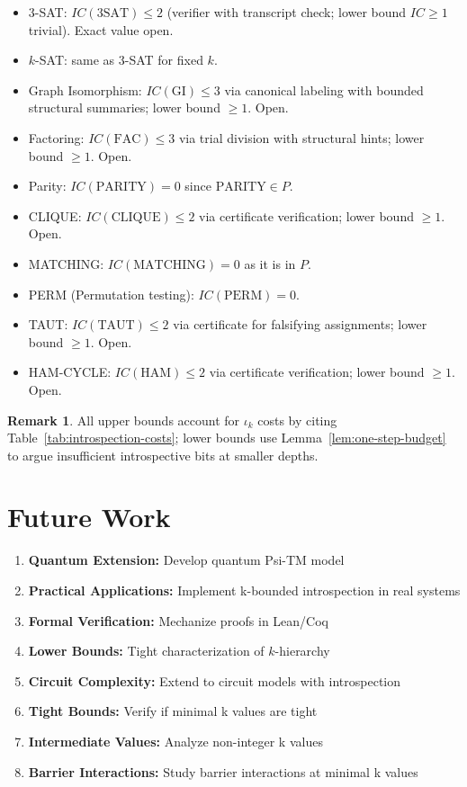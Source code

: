 \documentclass[11pt]{article}
\theoremstyle{definition}
\newtheorem{remark}[theorem]{Remark}
\begin{document}
\begin{itemize}
  \item 3-SAT: $IC(\mathrm{3SAT})\le 2$ (verifier with transcript check; lower bound $IC\ge1$ trivial). Exact value open.
  \item $k$-SAT: same as 3-SAT for fixed $k$.
  \item Graph Isomorphism: $IC(\mathrm{GI})\le 3$ via canonical labeling with bounded structural summaries; lower bound $\ge1$. Open.
  \item Factoring: $IC(\mathrm{FAC})\le 3$ via trial division with structural hints; lower bound $\ge1$. Open.
  \item Parity: $IC(\mathrm{PARITY})=0$ since $\mathrm{PARITY}\in P$.
  \item CLIQUE: $IC(\mathrm{CLIQUE})\le 2$ via certificate verification; lower bound $\ge1$. Open.
  \item MATCHING: $IC(\mathrm{MATCHING})=0$ as it is in $P$.
  \item PERM (Permutation testing): $IC(\mathrm{PERM})=0$.
  \item TAUT: $IC(\mathrm{TAUT})\le 2$ via certificate for falsifying assignments; lower bound $\ge1$. Open.
  \item HAM-CYCLE: $IC(\mathrm{HAM})\le 2$ via certificate verification; lower bound $\ge1$. Open.
\end{itemize}

\begin{remark}
All upper bounds account for $\iota_k$ costs by citing Table~\ref{tab:introspection-costs}; lower bounds use Lemma~\ref{lem:one-step-budget} to argue insufficient introspective bits at smaller depths.
\end{remark}

\section{Future Work}

\begin{enumerate}
\item \textbf{Quantum Extension:} Develop quantum Psi-TM model
\item \textbf{Practical Applications:} Implement k-bounded introspection in real systems  
\item \textbf{Formal Verification:} Mechanize proofs in Lean/Coq
\item \textbf{Lower Bounds:} Tight characterization of $k$-hierarchy
\item \textbf{Circuit Complexity:} Extend to circuit models with introspection
\item \textbf{Tight Bounds:} Verify if minimal k values are tight
\item \textbf{Intermediate Values:} Analyze non-integer k values
\item \textbf{Barrier Interactions:} Study barrier interactions at minimal k values
\end{enumerate}
\end{document}
